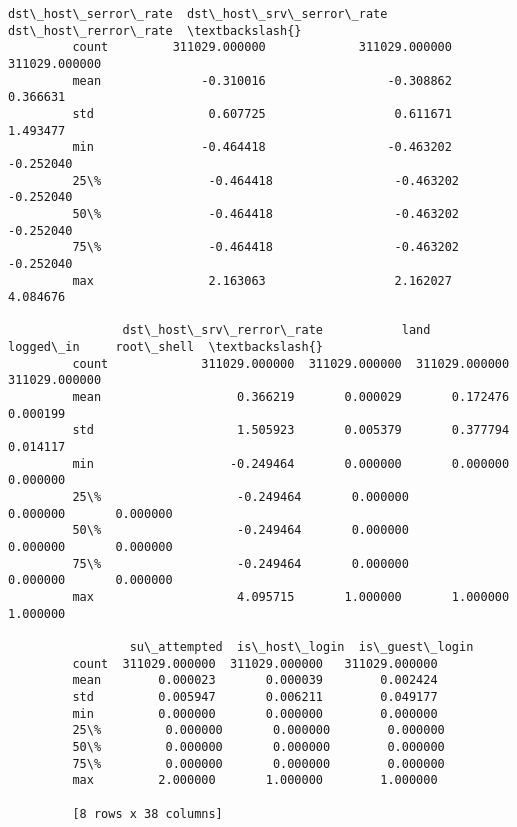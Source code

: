 \documentclass[11pt]{article}
\begin{document}
\begin{Verbatim}[commandchars=\\\{\}]
                dst\_host\_serror\_rate  dst\_host\_srv\_serror\_rate  dst\_host\_rerror\_rate  \textbackslash{}
         count         311029.000000             311029.000000         311029.000000   
         mean              -0.310016                 -0.308862              0.366631   
         std                0.607725                  0.611671              1.493477   
         min               -0.464418                 -0.463202             -0.252040   
         25\%               -0.464418                 -0.463202             -0.252040   
         50\%               -0.464418                 -0.463202             -0.252040   
         75\%               -0.464418                 -0.463202             -0.252040   
         max                2.163063                  2.162027              4.084676   
         
                dst\_host\_srv\_rerror\_rate           land      logged\_in     root\_shell  \textbackslash{}
         count             311029.000000  311029.000000  311029.000000  311029.000000   
         mean                   0.366219       0.000029       0.172476       0.000199   
         std                    1.505923       0.005379       0.377794       0.014117   
         min                   -0.249464       0.000000       0.000000       0.000000   
         25\%                   -0.249464       0.000000       0.000000       0.000000   
         50\%                   -0.249464       0.000000       0.000000       0.000000   
         75\%                   -0.249464       0.000000       0.000000       0.000000   
         max                    4.095715       1.000000       1.000000       1.000000   
         
                 su\_attempted  is\_host\_login  is\_guest\_login  
         count  311029.000000  311029.000000   311029.000000  
         mean        0.000023       0.000039        0.002424  
         std         0.005947       0.006211        0.049177  
         min         0.000000       0.000000        0.000000  
         25\%         0.000000       0.000000        0.000000  
         50\%         0.000000       0.000000        0.000000  
         75\%         0.000000       0.000000        0.000000  
         max         2.000000       1.000000        1.000000  
         
         [8 rows x 38 columns]
\end{Verbatim}
            
\end{document}
